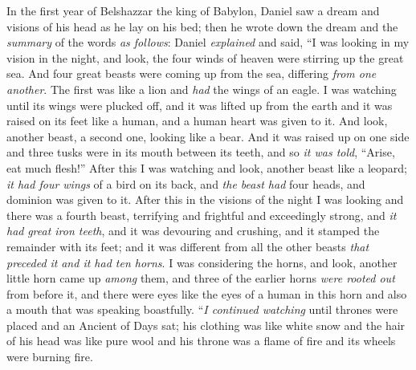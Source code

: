 \begin{biblechapter} %
 In the first year of Belshazzar the king of Babylon, Daniel saw a dream and visions of his head as he lay on his bed; then he wrote down the dream and the \textit{summary} of the words \textit{as follows}:
\verse Daniel \textit{explained} and said, “I was looking in my vision in the night, and look, the four winds of heaven were stirring up the great sea.
\verse And four great beasts were coming up from the sea, differing \textit{from one another}.
\verse The first was like a lion and \textit{had} the wings of an eagle. I was watching until its wings were plucked off, and it was lifted up from the earth and it was raised on its feet like a human, and a human heart was given to it.
\verse And look, another beast, a second one, looking like a bear. And it was raised up on one side and three tusks were in its mouth between its teeth, and so \textit{it was told}, “Arise, eat much flesh!”
\verse After this I was watching and look, another beast like a leopard; \textit{it had four wings} of a bird on its back, and \textit{the beast had} four heads, and dominion was given to it.
\verse After this in the visions of the night I was looking and there was a fourth beast, terrifying and frightful and exceedingly strong, and \textit{it had} \textit{great iron teeth}, and it was devouring and crushing, and it stamped the remainder with its feet; and it was different from all the other beasts \textit{that preceded it} \textit{and it had ten horns}.
\verse I was considering the horns, and look, another little horn came up \textit{among} them, and three of the earlier horns \textit{were rooted out} from before it, and there were eyes like the eyes of a human in this horn and also a mouth that was speaking boastfully.
\verse “\textit{I continued watching} until thrones were placed and an Ancient of Days sat; his clothing was like white snow and the hair of his head was like pure wool and his throne was a flame of fire and its wheels were burning fire.

\end{biblechapter}
